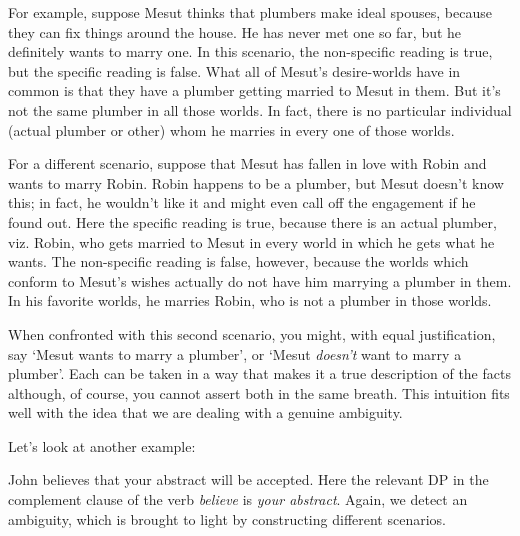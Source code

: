 For example, suppose Mesut thinks that plumbers make ideal spouses, because they
can fix things around the house. He has never met one so far, but he definitely
wants to marry one. In this scenario, the non-specific reading is true, but the
specific reading is false. What all of Mesut's desire-worlds have in common is
that they have a plumber getting married to Mesut in them. But it's not the same
plumber in all those worlds. In fact, there is no particular individual (actual
plumber or other) whom he marries in every one of those worlds.

For a different scenario, suppose that Mesut has fallen in love with Robin and
wants to marry Robin. Robin happens to be a plumber, but Mesut doesn't know this;
in fact, he wouldn't like it and might even call off the engagement if he found
out. Here the specific reading is true, because there is an actual plumber, viz.
Robin, who gets married to Mesut in every world in which he gets what he wants.
The non-specific reading is false, however, because the worlds which conform to
Mesut's wishes actually do not have him marrying a plumber in them. In his
favorite worlds, he marries Robin, who is not a plumber in those worlds.

When confronted with this second scenario, you might, with equal justification,
say `Mesut wants to marry a plumber', or `Mesut \emph{doesn't} want to marry a
plumber'. Each can be taken in a way that makes it a true description of the
facts \dash although, of course, you cannot assert both in the same
breath. This intuition
fits well with the idea that we are dealing with a genuine ambiguity.

Let's look at another example:

\ex John believes that your abstract will be accepted. \xe
%
Here the relevant DP in the complement clause of the verb \emph{believe} is
\emph{your abstract}. Again, we detect an ambiguity, which is brought to light
by constructing different scenarios.

